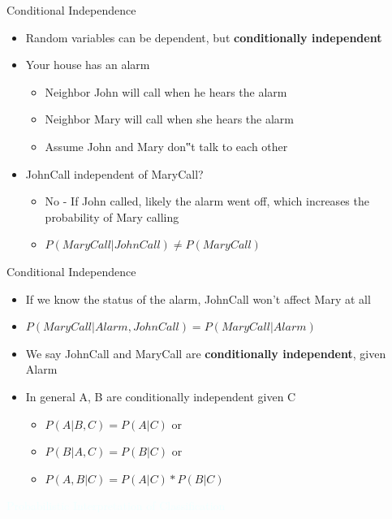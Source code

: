 \documentclass{beamer}
\newcommand{\thblue}[1]{{\Huge {\textcolor{azure}{#1}}}}
\begin{document}
\begin{frame}{Conditional Independence}
    \begin{itemize}
        \item Random variables can be dependent, but {\bf conditionally independent}
        \item Your house has an alarm
        \begin{itemize}
            \item Neighbor John will call when he hears the alarm
            \item Neighbor Mary will call when she hears the alarm
            \item Assume John and Mary don‟t talk to each other
        \end{itemize}
        \item JohnCall independent of MaryCall? \pause
        \begin{itemize}
            \item No - If John called, likely the alarm went off, which increases the probability of Mary calling
            \item $P(MaryCall | JohnCall) \neq  P(MaryCall)$
        \end{itemize}
    \end{itemize}
\end{frame}

\begin{frame}{Conditional Independence}
    \begin{itemize}
        \item If we know the status of the alarm, JohnCall won't affect Mary at all
        \item $P(MaryCall | Alarm, JohnCall) = P(MaryCall | Alarm)$
        \item We say JohnCall and MaryCall are {\bf conditionally independent}, given Alarm
        \item In general A, B are conditionally independent given C
        \begin{itemize}
            \item $P(A | B, C) = P(A | C)$ or
            \item $P(B | A, C) = P(B | C)$ or 
            \item $P(A, B | C) = P(A | C) * P(B | C)$
        \end{itemize}
    \end{itemize}
\end{frame}

\begin{frame}{} 
    \begin{center}
        \thblue{Probabilistic Interpretation of Classification}
    \end{center}
\end{frame}
\end{document}
